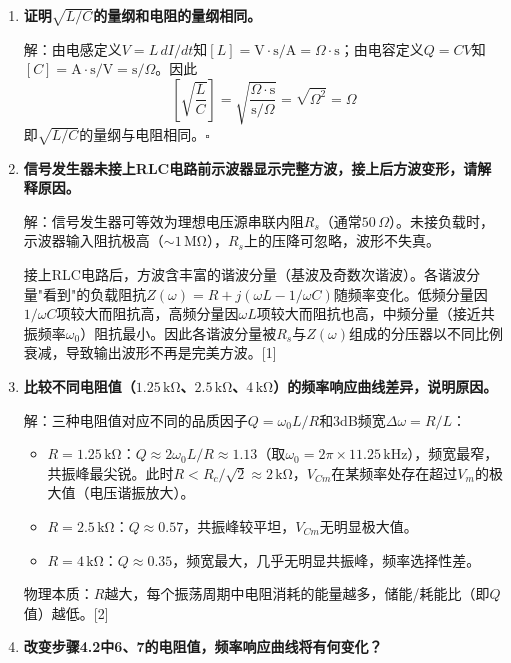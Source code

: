 \documentclass[12pt, a4paper]{article}
\begin{document}
\begin{enumerate}[label=\textbf{\arabic*.}]
    \item \textbf{证明$\sqrt{L/C}$的量纲和电阻的量纲相同。}

    解：由电感定义$V = L\,dI/dt$知$[L] = \mathrm{V\cdot s/A} = \Omega\cdot\mathrm{s}$；由电容定义$Q = CV$知$[C] = \mathrm{A\cdot s/V} = \mathrm{s}/\Omega$。因此
    \[
        \left[\sqrt{\frac{L}{C}}\right] = \sqrt{\frac{\Omega\cdot\mathrm{s}}{\mathrm{s}/\Omega}} = \sqrt{\Omega^2} = \Omega
    \]
    即$\sqrt{L/C}$的量纲与电阻相同。$\square$ \quad [1]

    \item \textbf{信号发生器未接上RLC电路前示波器显示完整方波，接上后方波变形，请解释原因。}

    解：信号发生器可等效为理想电压源串联内阻$R_s$（通常$50\,\Omega$）。未接负载时，示波器输入阻抗极高（$\sim 1\,\mathrm{M\Omega}$），$R_s$上的压降可忽略，波形不失真。

    接上RLC电路后，方波含丰富的谐波分量（基波及奇数次谐波）。各谐波分量"看到"的负载阻抗$Z(\omega) = R + j(\omega L - 1/\omega C)$随频率变化。低频分量因$1/\omega C$项较大而阻抗高，高频分量因$\omega L$项较大而阻抗也高，中频分量（接近共振频率$\omega_0$）阻抗最小。因此各谐波分量被$R_s$与$Z(\omega)$组成的分压器以不同比例衰减，导致输出波形不再是完美方波。[1]

    \item \textbf{比较不同电阻值（$1.25\,\mathrm{k\Omega}$、$2.5\,\mathrm{k\Omega}$、$4\,\mathrm{k\Omega}$）的频率响应曲线差异，说明原因。}

    解：三种电阻值对应不同的品质因子$Q = \omega_0 L / R$和3dB频宽$\Delta\omega = R/L$：

    \begin{itemize}
        \item $R = 1.25\,\mathrm{k\Omega}$：$Q \approx 2\omega_0 L/R \approx 1.13$（取$\omega_0 = 2\pi \times 11.25\,\mathrm{kHz}$），频宽最窄，共振峰最尖锐。此时$R < R_c/\sqrt{2} \approx 2\,\mathrm{k\Omega}$，$V_{Cm}$在某频率处存在超过$V_m$的极大值（电压谐振放大）。
        \item $R = 2.5\,\mathrm{k\Omega}$：$Q \approx 0.57$，共振峰较平坦，$V_{Cm}$无明显极大值。
        \item $R = 4\,\mathrm{k\Omega}$：$Q \approx 0.35$，频宽最大，几乎无明显共振峰，频率选择性差。
    \end{itemize}
    物理本质：$R$越大，每个振荡周期中电阻消耗的能量越多，储能/耗能比（即$Q$值）越低。[2]

    \item \textbf{改变步骤4.2中6、7的电阻值，频率响应曲线将有何变化？}


\end{enumerate}
\end{document}
